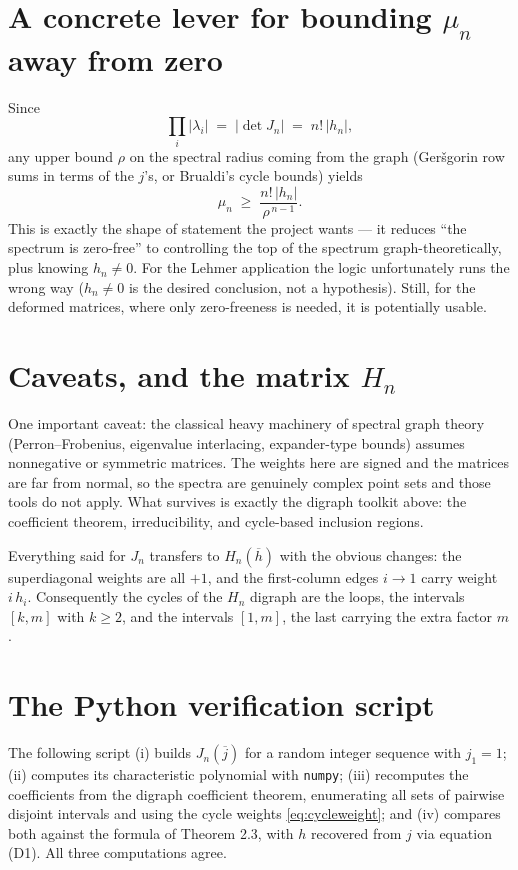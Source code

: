 \documentclass[11pt, fleqn]{amsart}
\theoremstyle{remark}
\begin{document}
\section{A concrete lever for bounding $\mu_n$ away from zero}

Since
\[
\prod_i |\lambda_i| \;=\; |\det J_n| \;=\; n!\,|h_n|,
\]
any upper bound $\rho$ on the spectral radius coming from the graph
(Ger\v{s}gorin row sums in terms of the $j$'s, or Brualdi's cycle
bounds) yields
\[
\mu_n \;\ge\; \frac{n!\,|h_n|}{\rho^{\,n-1}}.
\]
This is exactly the shape of statement the project wants --- it reduces
``the spectrum is zero-free'' to controlling the top of the spectrum
graph-theoretically, plus knowing $h_n \neq 0$. For the Lehmer
application the logic unfortunately runs the wrong way ($h_n \neq 0$ is
the desired conclusion, not a hypothesis). Still, for the deformed
matrices, where only zero-freeness is needed, it is potentially usable.

\section{Caveats, and the matrix $H_n$}

One important caveat: the classical heavy machinery of spectral graph
theory (Perron--Frobenius, eigenvalue interlacing, expander-type
bounds) assumes nonnegative or symmetric matrices. The weights here are
signed and the matrices are far from normal, so the spectra are
genuinely complex point sets and those tools do not apply. What
survives is exactly the digraph toolkit above: the coefficient theorem,
irreducibility, and cycle-based inclusion regions.

Everything said for $J_n$ transfers to $H_n(\overline{h})$ with the
obvious changes: the superdiagonal weights are all $+1$, and the
first-column edges $i \to 1$ carry weight $i\,h_i$. Consequently the
cycles of the $H_n$ digraph are the loops, the intervals $[k,m]$ with
$k \ge 2$, and the intervals $[1,m]$, the last carrying the extra
factor $m$.

\section{The Python verification script}\label{sec:script}

The following script (i) builds $J_n(\overline{j})$ for a random
integer sequence with $j_1 = 1$; (ii) computes its characteristic
polynomial with \texttt{numpy}; (iii) recomputes the coefficients from
the digraph coefficient theorem, enumerating all sets of pairwise
disjoint intervals and using the cycle weights
\eqref{eq:cycleweight}; and (iv) compares both against the formula of
Theorem 2.3, with $h$ recovered from $j$ via equation (D1). All three
computations agree.
\end{document}
